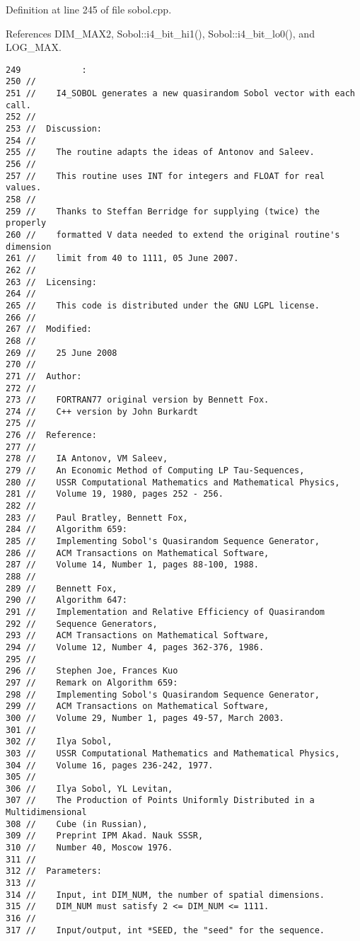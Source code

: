 Definition at line 245 of file sobol.cpp.

References DIM\_\-MAX2, Sobol::i4\_\-bit\_\-hi1(), Sobol::i4\_\-bit\_\-lo0(), and LOG\_\-MAX.

\begin{Code}\begin{verbatim}249            :
250 //
251 //    I4_SOBOL generates a new quasirandom Sobol vector with each call.
252 //
253 //  Discussion:
254 //
255 //    The routine adapts the ideas of Antonov and Saleev.
256 //
257 //    This routine uses INT for integers and FLOAT for real values.
258 //
259 //    Thanks to Steffan Berridge for supplying (twice) the properly
260 //    formatted V data needed to extend the original routine's dimension
261 //    limit from 40 to 1111, 05 June 2007.
262 //
263 //  Licensing:
264 //
265 //    This code is distributed under the GNU LGPL license. 
266 //
267 //  Modified:
268 //
269 //    25 June 2008
270 //
271 //  Author:
272 //
273 //    FORTRAN77 original version by Bennett Fox.
274 //    C++ version by John Burkardt
275 //
276 //  Reference:
277 //
278 //    IA Antonov, VM Saleev,
279 //    An Economic Method of Computing LP Tau-Sequences,
280 //    USSR Computational Mathematics and Mathematical Physics,
281 //    Volume 19, 1980, pages 252 - 256.
282 //
283 //    Paul Bratley, Bennett Fox,
284 //    Algorithm 659:
285 //    Implementing Sobol's Quasirandom Sequence Generator,
286 //    ACM Transactions on Mathematical Software,
287 //    Volume 14, Number 1, pages 88-100, 1988.
288 //
289 //    Bennett Fox,
290 //    Algorithm 647:
291 //    Implementation and Relative Efficiency of Quasirandom 
292 //    Sequence Generators,
293 //    ACM Transactions on Mathematical Software,
294 //    Volume 12, Number 4, pages 362-376, 1986.
295 //
296 //    Stephen Joe, Frances Kuo
297 //    Remark on Algorithm 659:
298 //    Implementing Sobol's Quasirandom Sequence Generator,
299 //    ACM Transactions on Mathematical Software,
300 //    Volume 29, Number 1, pages 49-57, March 2003.
301 //
302 //    Ilya Sobol,
303 //    USSR Computational Mathematics and Mathematical Physics,
304 //    Volume 16, pages 236-242, 1977.
305 //
306 //    Ilya Sobol, YL Levitan, 
307 //    The Production of Points Uniformly Distributed in a Multidimensional 
308 //    Cube (in Russian),
309 //    Preprint IPM Akad. Nauk SSSR, 
310 //    Number 40, Moscow 1976.
311 //
312 //  Parameters:
313 //
314 //    Input, int DIM_NUM, the number of spatial dimensions.
315 //    DIM_NUM must satisfy 2 <= DIM_NUM <= 1111.
316 //
317 //    Input/output, int *SEED, the "seed" for the sequence.

\end{verbatim}
\end{Code}
